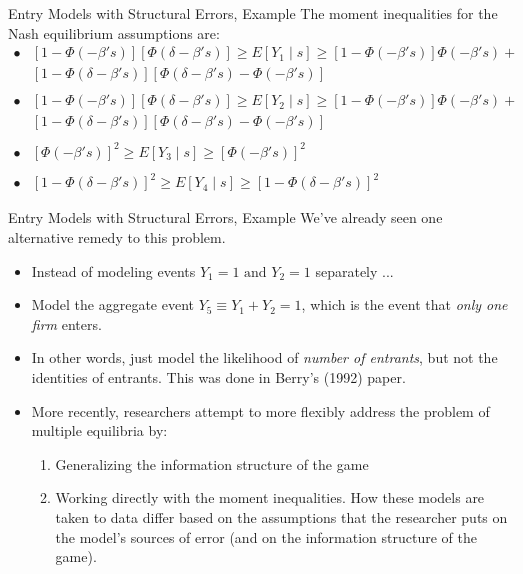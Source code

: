 \documentclass[xcolor=pdftex,dvipsnames,table,mathserif]{beamer}
\begin{document}
\begin{frame}{Entry Models with Structural Errors, Example}
The moment inequalities for the Nash equilibrium assumptions are:
\begin{equation*}
\begin{split}
\bullet & [1- \Phi(-\beta 's)][\Phi(\delta - \beta 's)] \geq E[Y_1 \mid s] \geq [1 -\Phi(-\beta 's)] \Phi(-\beta 's) + \\ 
& [1 - \Phi(\delta - \beta 's)][\Phi(\delta - \beta 's) - \Phi(-\beta 's)] \\ \\
\bullet & [1- \Phi(-\beta 's)][\Phi(\delta - \beta 's)] \geq E[Y_2 \mid s] \geq [1 -\Phi(-\beta 's)] \Phi(-\beta 's) + \\ 
& [1 - \Phi(\delta - \beta 's)][\Phi(\delta - \beta 's) - \Phi(-\beta 's)] \\ \\
\bullet & [\Phi(-\beta 's)]^2 \geq E[Y_3 \mid s] \geq [\Phi (-\beta 's)]^2 \\ \\
\bullet & [1 - \Phi (\delta - \beta 's)]^2 \geq E[Y_4 \mid s] \geq [1 - \Phi (\delta - \beta 's)]^2
\end{split}
\end{equation*}
\end{frame}
\begin{frame}{Entry Models with Structural Errors, Example}
We've already seen one alternative remedy to this problem. 
\begin{itemize}
\item Instead of modeling events $Y_1 = 1 \text{ and } Y_2 = 1$ separately ...
\item Model the aggregate event $Y_5 \equiv Y_1 + Y_2 = 1$, which is the event that \emph{only one firm} enters.
\item In other words, just model the likelihood of \emph{number of entrants}, but not the identities of entrants. This was done in Berry's (1992) paper. 
\item More recently, researchers attempt to more flexibly address the problem of multiple equilibria by:
\begin{enumerate} 
\item Generalizing the information structure of the game
\item Working directly with the moment inequalities.  How these models are taken to data differ based on the assumptions that the researcher puts on the model's sources of error (and on the information structure of the game).
\end{enumerate}
\end{itemize}
\end{frame}
\end{document}
